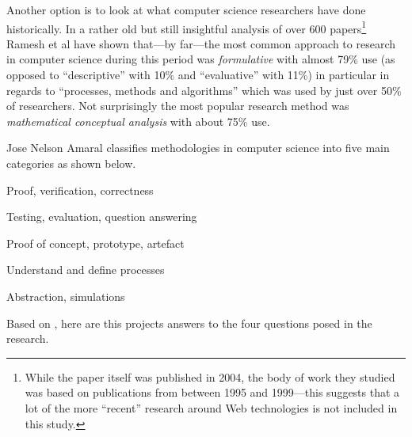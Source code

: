 Another option is to look at what computer science researchers have done historically. In a rather old but still insightful analysis of over \num{600} papers\footnote{While the paper itself was published in 2004, the body of work they studied was based on publications from between 1995 and 1999---this suggests that a lot of the more ``recent'' research around Web technologies is not included in this study.} Ramesh et al \citeyear{Ramesh2004} have shown that---by far---the most common approach to research in computer science during this period was \emph{formulative} with almost 79\% use (as opposed to ``descriptive'' with 10\% and ``evaluative'' with 11\%) in particular in regards to ``processes, methods and algorithms'' which was used by just over 50\% of researchers. Not surprisingly the most popular research method was \emph{mathematical conceptual analysis} with about 75\% use.

Jose Nelson Amaral \citeyear{Amaral2006} classifies methodologies in computer science into five main categories as shown below.

\begin{description}[leftmargin=3.5cm]
  \item [Formal] Proof, verification, correctness
  \item [Experimental] Testing, evaluation, question answering
  \item [Build] Proof of concept, prototype, artefact
  \item [Process] Understand and define processes
  \item [Model] Abstraction, simulations
\end{description}

\spirals

Based on \autocite{Holz2006}, here are this projects answers to the four questions posed in the research.

